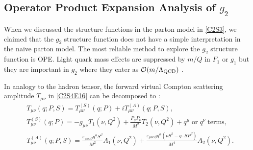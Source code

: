 \subsection{\texorpdfstring{Operator Product Expansion Analysis of $g_2$}{Operator Product Expansion Analysis of g2}}

When we discussed the structure functions in the parton model in \cref{C2S3}, we claimed that the $g_2$ structure function does not have a simple interpretation in the naive parton model. The most reliable method to explore the $g_2$ structure function is OPE. Light quark mass effects are suppressed by $m/Q$ in $F_1$ or $g_1$ but they are important in $g_2$ where they enter as $\order{m/\Lambda_{\mathrm{QCD}}}$ \cite{Jaffe1991}.

In analogy to the hadron tensor, the forward virtual Compton scattering amplitude $T_{\mu\nu}$ in \cref{C2S4E16} can be decomposed to \cite{Jaffe1990}:
\begin{align} \label{C3S2E8}
& T_{\mu\nu}(q;P,S) = T_{\mu\nu}^{(S)}(q;P) + iT_{\mu\nu}^{(A)}(q;P,S), \\ \label{C3S2E9}
& T_{\mu\nu}^{(S)}(q;P) = -g_{\mu\nu}T_1(\nu,Q^2)+\frac{P_\mu P_\nu}{M^2}T_2(\nu,Q^2)+q^\mu\;\mathrm{or}\; q^\nu\;\mathrm{terms}, \\ \label{C3S2E10}
& T_{\mu\nu}^{(A)}(q;P,S) = \frac{\varepsilon_{\mu\nu\alpha\beta}q^\alpha S^\beta}{M^2}A_1(\nu,Q^2)+\frac{\varepsilon_{\mu\nu\alpha\beta}q^\alpha(\nu S^\beta-q\cdot SP^\beta)}{M^4}A_2(\nu,Q^2).
\end{align}

